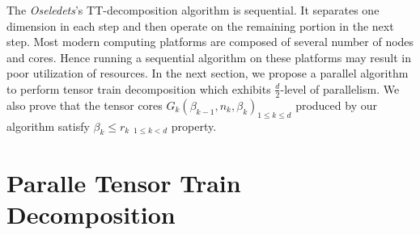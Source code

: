 \documentclass[runningheads]{llncs}
\begin{document}
The \textit{Oseledets}'s TT-decomposition algorithm is sequential. It separates one dimension in each step and then operate on the remaining portion in the next step. Most modern computing platforms are composed of several number of nodes and cores. Hence running a sequential algorithm on these platforms may result in poor utilization of resources. In the next section, we propose a parallel algorithm to perform tensor train decomposition which exhibits $\frac{d}{2}$-level of parallelism. We also prove that the tensor cores $G_k(\beta_{k-1}, n_k, \beta_k) _{1\le k\le d}$ produced by our algorithm satisfy $\beta_k \le r_k$ $_{1\le k < d}$ property.
 

\section{Paralle Tensor Train Decomposition}
\label{sec:tt_parallel}
\end{document}
